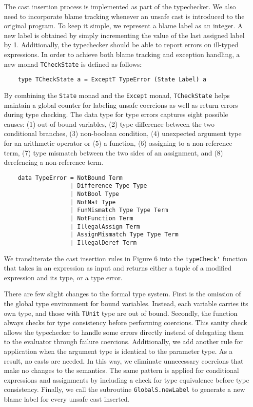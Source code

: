 The cast insertion process is implemented as part of the typechecker. 
We also need to incorporate blame tracking whenever an unsafe cast 
is introduced to the original program. To keep it simple, we 
represent a blame label as an integer. A new label is obtained 
by simply incrementing the value of the last assigned label by 1. 
Additionally, the typechecker should be able to report errors on 
ill-typed expressions. In order to achieve both blame tracking 
and exception handling, a new monad \lstinline{TCheckState} is defined 
as follows:
\begin{lstlisting} 
    type TCheckState a = ExceptT TypeError (State Label) a
\end{lstlisting}
By combining the \lstinline{State} monad and the \lstinline{Except} monad, \lstinline{TCheckState} 
helps maintain a global counter for labeling unsafe coercions 
as well as return errors during type checking. The data type 
for type errors captures eight possible causes: (1) out-of-bound variables, 
(2) type difference between the two conditional branches, (3) non-boolean condition, 
(4) unexpected argument type for an arithmetic operator or (5) a function, 
(6) assigning to a non-reference term, 
(7) type mismatch between the two sides of an assignment, and (8) derefencing a 
non-reference term. 

\begin{lstlisting}
    data TypeError = NotBound Term                 
                   | Difference Type Type           
                   | NotBool Type                  
                   | NotNat Type    
                   | FunMismatch Type Type Term                  
                   | NotFunction Term               
                   | IllegalAssign Term            
                   | AssignMismatch Type Type Term  
                   | IllegalDeref Term   
\end{lstlisting}

We transliterate the cast insertion rules in Figure 6 
into the \lstinline{typeCheck'} function that takes in an expression as input 
and returns either a tuple of a modified expression and its type, 
or a type error.



There are few slight changes to the formal type system. First is the 
omission of the global type environment for bound variables. Instead, each 
variable carries its own type, and those with \lstinline{TUnit} type are 
out of bound. Secondly, the function always checks for type 
consistency before performing coercions. This sanity check allows the 
typechecker to handle some errors directly instead of delegating them 
to the evaluator through failure coercions. 
Additionally, we add another rule for application when the 
argument type is identical to the parameter type. As a result, no casts 
are needed. In this way, we eliminate unnecessary coercions that make 
no changes to the semantics. The same pattern is applied for conditional 
expressions and assignments by including a check for type equivalence before 
type consistency. Finally, we call the subroutine \lstinline{GlobalS.newLabel} 
to generate a new blame label for every unsafe cast inserted. 

